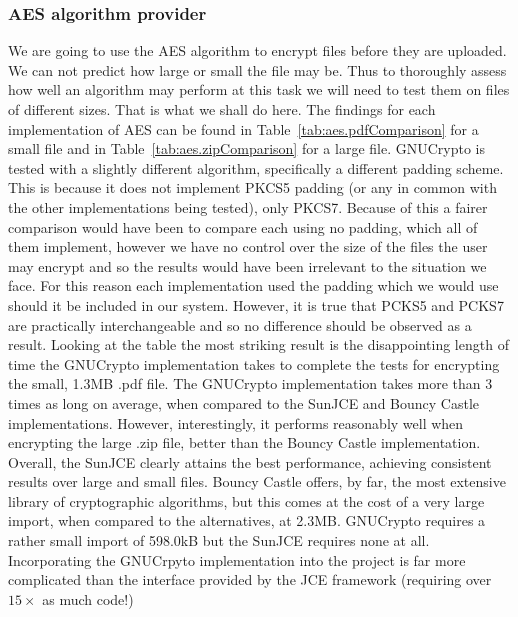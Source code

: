 \documentclass[12pt, titlepage]{article}
\begin{document}
\subsubsection{AES algorithm provider}
We are going to use the AES algorithm to encrypt files before they are uploaded. We can not predict how large or small the file may be. Thus to thoroughly assess how well an algorithm may perform at this task we will need to test them on files of different sizes. That is what we shall do here.
\newline \indent The findings for each implementation of AES can be found in Table~\ref{tab:aes.pdfComparison} for a small file and in Table~\ref{tab:aes.zipComparison} for a large file.
\newline \indent GNUCrypto is tested with a slightly different algorithm, specifically a different padding scheme. This is because it does not implement PKCS5 padding (or any in common with the other implementations being tested), only PKCS7. Because of this a fairer comparison would have been to compare each using no padding, which all of them implement, however we have no control over the size of the files the user may encrypt and so the results would have been irrelevant to the situation we face. For this reason each implementation used the padding which we would use should it be included in our system. However, it is true that PCKS5 and PCKS7 are practically interchangeable and so no difference should be observed as a result.
\newline \indent Looking at the table the most striking result is the disappointing length of time the GNUCrypto implementation takes to complete the tests for encrypting the small, 1.3MB .pdf file. The GNUCrypto implementation takes more than 3 times as long on average, when compared to the SunJCE and Bouncy Castle implementations. However, interestingly, it performs reasonably well when encrypting the large .zip file, better than the Bouncy Castle implementation. Overall, the SunJCE clearly attains the best performance, achieving consistent results over large and small files.
\newline \indent Bouncy Castle offers, by far, the most extensive library of cryptographic algorithms, but this comes at the cost of a very large import, when compared to the alternatives, at 2.3MB. GNUCrypto requires a rather small import of 598.0kB but the SunJCE requires none at all.
\newline \indent Incorporating the GNUCrpyto implementation into the project is far more complicated than the interface provided by the JCE framework (requiring over $15\times$ as much code!)
\end{document}
